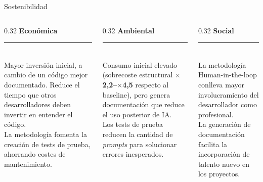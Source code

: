\documentclass[t]{beamer}
\begin{document}
\begin{frame}[noframenumbering]{Sostenibilidad}
    \begin{columns}[T]
        \begin{column}{0.32\textwidth}
            \centering\textbf{Económica}
            \rule{\linewidth}{0.4pt}\\[0.2cm]
            \footnotesize
            Mayor inversión inicial, a cambio de un código mejor documentado. Reduce el tiempo que otros desarrolladores deben invertir en entender el código.\\[0.3cm]
            La metodología fomenta la creación de tests de prueba, ahorrando costes de mantenimiento.
        \end{column}
        \begin{column}{0.32\textwidth}
            \centering\textbf{Ambiental}
            \rule{\linewidth}{0.4pt}\\[0.2cm]
            \footnotesize
            Consumo inicial elevado (sobrecoste estructural \textbf{$\times$2,2--$\times$4,5} respecto al baseline), pero genera documentación que reduce el uso posterior de IA.\\[0.3cm]
            Los tests de prueba reducen la cantidad de \textit{prompts} para solucionar errores inesperados.
        \end{column}
        \begin{column}{0.32\textwidth}
            \centering\textbf{Social}
            \rule{\linewidth}{0.4pt}\\[0.2cm]
            \footnotesize
            La metodología Human-in-the-loop conlleva mayor involucra\-miento del desarrollador como profesional.\\[0.3cm]
            La generación de documentación facilita la incorporación de talento nuevo en los proyectos.
        \end{column}
    \end{columns}
\end{frame}
\end{document}
